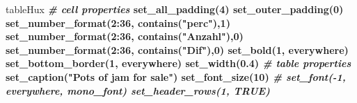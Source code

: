 \documentclass[
  a4paper,
  twoside]{article}
\newenvironment{Shaded}{\begin{snugshade}}{\end{snugshade}}
\newcommand{\CommentTok}[1]{\textcolor[rgb]{0.56,0.35,0.01}{\textit{#1}}}
\newcommand{\DecValTok}[1]{\textcolor[rgb]{0.00,0.00,0.81}{#1}}
\newcommand{\FloatTok}[1]{\textcolor[rgb]{0.00,0.00,0.81}{#1}}
\newcommand{\KeywordTok}[1]{\textcolor[rgb]{0.13,0.29,0.53}{\textbf{#1}}}
\newcommand{\NormalTok}[1]{#1}
\newcommand{\OperatorTok}[1]{\textcolor[rgb]{0.81,0.36,0.00}{\textbf{#1}}}
\newcommand{\OtherTok}[1]{\textcolor[rgb]{0.56,0.35,0.01}{#1}}
\newcommand{\StringTok}[1]{\textcolor[rgb]{0.31,0.60,0.02}{#1}}
\begin{document}
\begin{Shaded}
\begin{Highlighting}[]
\NormalTok{tableHux }\OperatorTok{%
\StringTok{  }\CommentTok{# cell properties}
\StringTok{        }\KeywordTok{set_all_padding}\NormalTok{(}\DecValTok{4}\NormalTok{) }\OperatorTok{%
\StringTok{      }\KeywordTok{set_outer_padding}\NormalTok{(}\DecValTok{0}\NormalTok{) }\OperatorTok{%
\StringTok{      }\KeywordTok{set_number_format}\NormalTok{(}\DecValTok{2}\OperatorTok{:}\DecValTok{36}\NormalTok{, }\KeywordTok{contains}\NormalTok{(}\StringTok{"perc"}\NormalTok{),}\DecValTok{1}\NormalTok{) }\OperatorTok{%
\StringTok{      }\KeywordTok{set_number_format}\NormalTok{(}\DecValTok{2}\OperatorTok{:}\DecValTok{36}\NormalTok{, }\KeywordTok{contains}\NormalTok{(}\StringTok{"Anzahl"}\NormalTok{),}\DecValTok{0}\NormalTok{) }\OperatorTok{%
\StringTok{        }\KeywordTok{set_number_format}\NormalTok{(}\DecValTok{2}\OperatorTok{:}\DecValTok{36}\NormalTok{, }\KeywordTok{contains}\NormalTok{(}\StringTok{"Dif"}\NormalTok{),}\DecValTok{0}\NormalTok{) }\OperatorTok{%
\StringTok{      }\KeywordTok{set_bold}\NormalTok{(}\DecValTok{1}\NormalTok{, everywhere) }\OperatorTok{%
\StringTok{      }\KeywordTok{set_bottom_border}\NormalTok{(}\DecValTok{1}\NormalTok{, everywhere) }\OperatorTok{%
\StringTok{      }\KeywordTok{set_width}\NormalTok{(}\FloatTok{0.4}\NormalTok{) }\OperatorTok{%
\StringTok{    }\CommentTok{#  table properties}
\StringTok{      }\KeywordTok{set_caption}\NormalTok{(}\StringTok{"Pots of jam for sale"}\NormalTok{) }\OperatorTok{%
\StringTok{      }\KeywordTok{set_font_size}\NormalTok{(}\DecValTok{10}\NormalTok{)   }\OperatorTok{%
\StringTok{      }\CommentTok{# set_font(-1, everywhere, mono_font)  %
\StringTok{      }\KeywordTok{set_header_rows}\NormalTok{(}\DecValTok{1}\NormalTok{, }\OtherTok{TRUE}\NormalTok{)                             }\OperatorTok{%
}}}}}}}}}}}}}
\end{Highlighting}
\end{Shaded}
\end{document}
